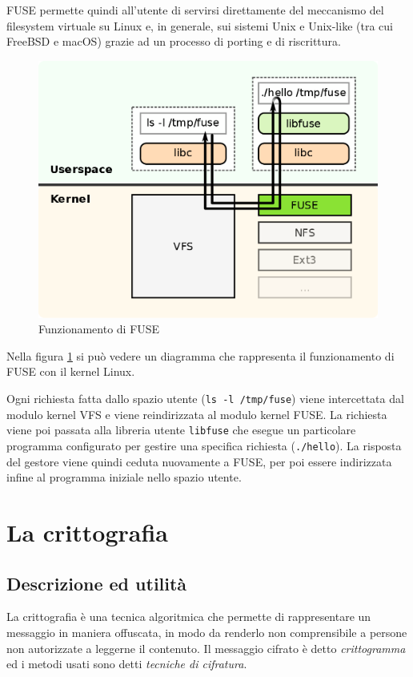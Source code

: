 \documentclass[a4paper,12pt,twoside,openright]{report}
\begin{document}
  FUSE permette quindi all'utente di servirsi direttamente del meccanismo
  del filesystem virtuale su Linux e, in generale, sui sistemi Unix e Unix-like (tra cui FreeBSD e macOS)
  grazie ad un processo di porting e di riscrittura.

  \begin{figure}[h!]
    \centering
    \includegraphics[width=0.6\linewidth]{images/fuse_structure.png}
    \caption{Funzionamento di FUSE}
    \label{fig:fuse-structure}
  \end{figure}

  Nella figura \ref{fig:fuse-structure} si può vedere un diagramma che rappresenta il funzionamento di FUSE
  con il kernel Linux.
  
  Ogni richiesta fatta dallo spazio utente (\texttt{ls -l /tmp/fuse}) viene intercettata
  dal modulo kernel VFS\footnotemark{} e viene reindirizzata al modulo kernel FUSE.
  La richiesta viene poi passata alla libreria utente \texttt{libfuse} che esegue
  un particolare programma configurato per gestire una specifica richiesta (\texttt{./hello}).
  La risposta del gestore viene quindi ceduta nuovamente a FUSE, per poi essere indirizzata infine
  al programma iniziale nello spazio utente.


  \section{La crittografia}

  \subsection{Descrizione ed utilità}
  La crittografia è una tecnica algoritmica che permette di rappresentare un messaggio in maniera offuscata,
  in modo da renderlo non comprensibile a persone non autorizzate a leggerne il contenuto.
  Il messaggio cifrato è detto \textit{crittogramma} ed i metodi usati sono detti \textit{tecniche di cifratura}.
\end{document}
